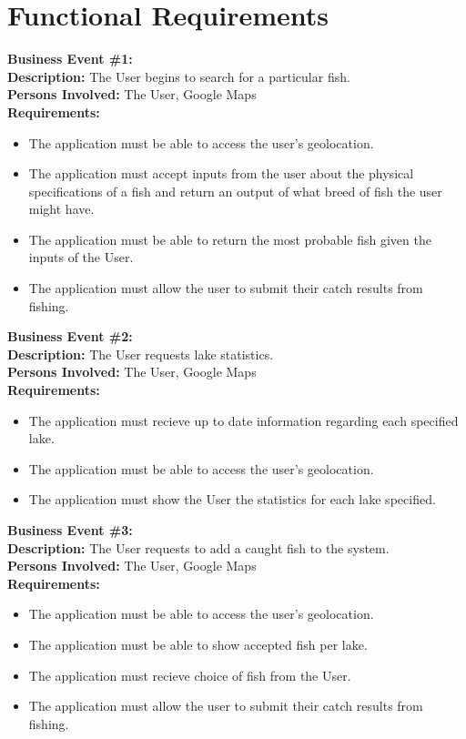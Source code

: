 \documentclass{article}
\begin{document}
\section{Functional Requirements}

	\noindent\textbf{Business Event \#1:} \\
	\textbf{Description:} The User begins to search for a particular fish. \\
	\textbf{Persons Involved:} The User, Google Maps \\
	\textbf{Requirements:}
	\begin{itemize}
		\item The application must be able to access the user's geolocation.
		\item The application must accept inputs from the user about the physical specifications of a fish and return an output of what breed of fish the user might have.
		\item The application must be able to return the most probable fish given the inputs of the User.
		\item The application must allow the user to submit their catch results from fishing.
	\end{itemize}

	\noindent\textbf{Business Event \#2:} \\
	\textbf{Description:} The User requests lake statistics. \\
	\textbf{Persons Involved:} The User, Google Maps \\
	\textbf{Requirements:}
	\begin{itemize}
		\item The application must recieve up to date information regarding each specified lake.
		\item The application must be able to access the user's geolocation.
		\item The application must show the User the statistics for each lake specified.
	\end{itemize}

	\noindent\textbf{Business Event \#3:} \\
	\textbf{Description:} The User requests to add a caught fish to the system. \\
	\textbf{Persons Involved:} The User, Google Maps \\
	\textbf{Requirements:}
	\begin{itemize}
		\item The application must be able to access the user's geolocation.
		\item The application must be able to show accepted fish per lake.
		\item The application must recieve choice of fish from the User.
		\item The application must allow the user to submit their catch results from fishing.
	\end{itemize}
\end{document}
